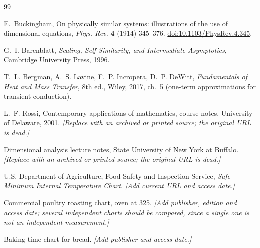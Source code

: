 \begin{thebibliography}{99}

E.~Buckingham, On physically similar systems: illustrations of the use of
dimensional equations, \emph{Phys. Rev.} \textbf{4} (1914) 345--376.
\href{https://doi.org/10.1103/PhysRev.4.345}{doi:10.1103/PhysRev.4.345}.

G.~I. Barenblatt, \emph{Scaling, Self-Similarity, and Intermediate
Asymptotics}, Cambridge University Press, 1996.

T.~L. Bergman, A.~S. Lavine, F.~P. Incropera, D.~P. DeWitt,
\emph{Fundamentals of Heat and Mass Transfer}, 8th ed., Wiley, 2017,
ch.~5 (one-term approximations for transient conduction).

L.~F. Rossi, Contemporary applications of mathematics, course notes,
University of Delaware, 2001.
\emph{[Replace with an archived or printed source; the original URL is
dead.]}

Dimensional analysis lecture notes, State University of New York at
Buffalo.
\emph{[Replace with an archived or printed source; the original URL is
dead.]}

U.S. Department of Agriculture, Food Safety and Inspection Service,
\emph{Safe Minimum Internal Temperature Chart}.
\emph{[Add current URL and access date.]}

Commercial poultry roasting chart, oven at \SI{325}{\degreeFahrenheit}.
\emph{[Add publisher, edition and access date; several independent charts
should be compared, since a single one is not an independent measurement.]}

Baking time chart for bread.
\emph{[Add publisher and access date.]}

\end{thebibliography}

%


